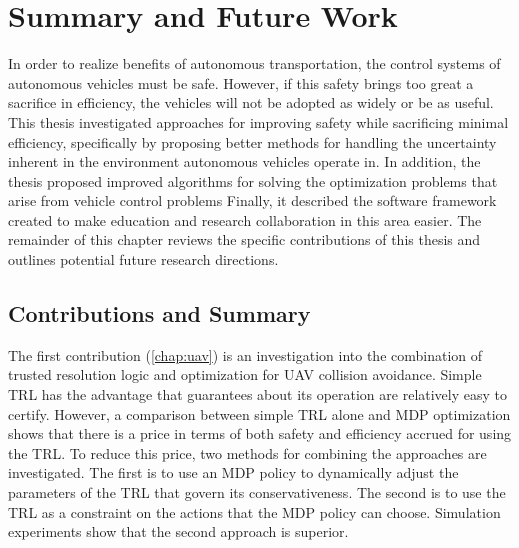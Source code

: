 \chapter{Summary and Future Work}

In order to realize benefits of autonomous transportation, the control systems of autonomous vehicles must be safe.
However, if this safety brings too great a sacrifice in efficiency, the vehicles will not be adopted as widely or be as useful.
This thesis investigated approaches for improving safety while sacrificing minimal efficiency, specifically by proposing better methods for handling the uncertainty inherent in the environment autonomous vehicles operate in.
In addition, the thesis proposed improved algorithms for solving the optimization problems that arise from vehicle control problems
Finally, it described the software framework created to make education and research collaboration in this area easier.
The remainder of this chapter reviews the specific contributions of this thesis and outlines potential future research directions.

\section{Contributions and Summary}

The first contribution (\cref{chap:uav}) is an investigation into the combination of trusted resolution logic and optimization for UAV collision avoidance.
Simple TRL has the advantage that guarantees about its operation are relatively easy to certify.
However, a comparison between simple TRL alone and MDP optimization shows that there is a price in terms of both safety and efficiency accrued for using the TRL.
To reduce this price, two methods for combining the approaches are investigated.
The first is to use an MDP policy to dynamically adjust the parameters of the TRL that govern its conservativeness.
The second is to use the TRL as a constraint on the actions that the MDP policy can choose.
Simulation experiments show that the second approach is superior.

